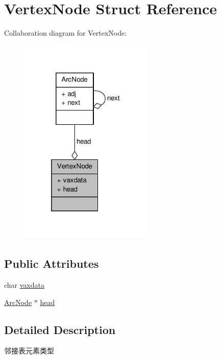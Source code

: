 \hypertarget{struct_vertex_node}{\section{\-Vertex\-Node \-Struct \-Reference}
\label{struct_vertex_node}
}


\-Collaboration diagram for \-Vertex\-Node\-:
\nopagebreak
\begin{figure}[H]
\begin{center}
\leavevmode
\includegraphics[width=181pt]{struct_vertex_node__coll__graph}
\end{center}
\end{figure}
\subsection*{\-Public \-Attributes}
\begin{DoxyCompactItemize}
\item 
char \hyperlink{struct_vertex_node_aab75cbfa32f9a250283471ad09ab2396}{vaxdata}
\item 
\hyperlink{struct_arc_node}{\-Arc\-Node} $\ast$ \hyperlink{struct_vertex_node_acaae45f5b86fb061c0356fcad1ec60fc}{head}
\end{DoxyCompactItemize}


\subsection{\-Detailed \-Description}
邻接表元素类型 

